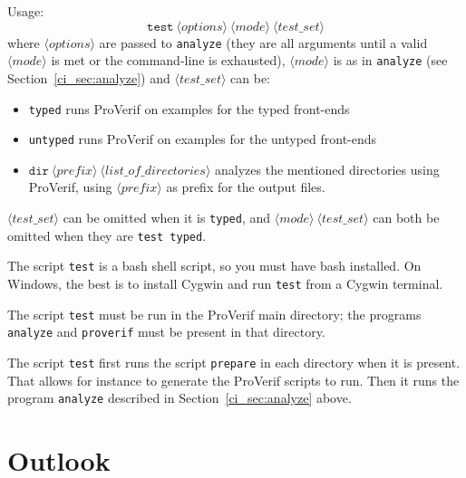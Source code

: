 \documentclass{book}
\newcommand{\nonterm}[1]{\langle\mathit{#1}\rangle}
\begin{document}
Usage:
\[\mathtt{test}\ \nonterm{options}\ \nonterm{mode}\ \nonterm{test\_set}\]
where
$\nonterm{options}$ are passed to \texttt{analyze} (they are all arguments until
a valid $\nonterm{mode}$ is met or the command-line is exhausted),
$\nonterm{mode}$ is as in \texttt{analyze} (see Section~\ref{ci_sec:analyze})
and $\nonterm{test\_set}$ can be:
\begin{itemize}
\item \texttt{typed} runs ProVerif on examples for the typed front-ends
\item \texttt{untyped} runs ProVerif on examples for the untyped front-ends
\item $\texttt{dir}\ \nonterm{prefix}\ \nonterm{list\_of\_directories}$ analyzes the mentioned directories using ProVerif, using $\nonterm{prefix}$ as prefix for the output files.
\end{itemize}
$\nonterm{test\_set}$ can be omitted when it is \texttt{typed},
and $\nonterm{mode}\ \nonterm{test\_set}$ can both be omitted when they are
\texttt{test\ typed}.

The script \texttt{test} is a bash shell script, so you must have bash
installed. On Windows, the best is to install Cygwin and run \texttt{test}
from a Cygwin terminal.

The script \texttt{test} must be run in the ProVerif main directory;
the programs \texttt{analyze} and \texttt{proverif}
must be present in that directory.

The script \texttt{test} first runs the script {\tt prepare}
in each directory when it is present. That allows for instance to
generate the ProVerif scripts to run.
Then it runs the program {\tt analyze} described in Section~\ref{ci_sec:analyze} above.


\chapter{Outlook}\label{sec:outlook}
\end{document}
